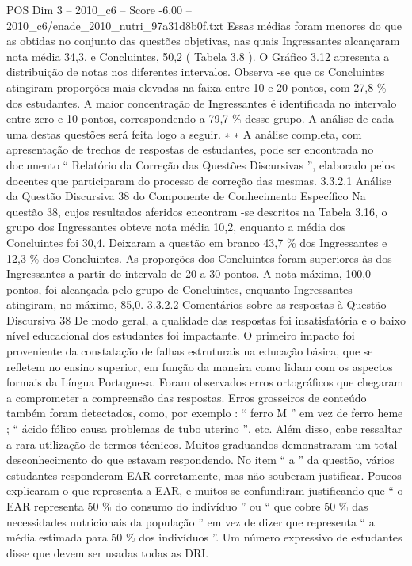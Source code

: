 \begin{textsample}{POS Dim 3 – 2010\_c6 – Score -6.00 – 2010\_c6/enade\_2010\_nutri\_97a31d8b0f.txt}
Essas médias foram menores do que as obtidas no conjunto das questões objetivas, nas quais Ingressantes alcançaram nota média 34,3, e Concluintes, 50,2 ( Tabela 3.8 ).
O Gráfico 3.12 apresenta a distribuição de notas nos diferentes intervalos.
Observa -se que os Concluintes atingiram proporções mais elevadas na faixa entre 10 e 20 pontos, com 27,8 \% dos estudantes.
A maior concentração de Ingressantes é identificada no intervalo entre zero e 10 pontos, correspondendo a 79,7 \% desse grupo.
A análise de cada uma destas questões será feita logo a seguir. ∗ ∗ A análise completa, com apresentação de trechos de respostas de estudantes, pode ser encontrada no documento “ Relatório da Correção das Questões Discursivas ”, elaborado pelos docentes que participaram do processo de correção das mesmas. 3.3.2.1 Análise da Questão Discursiva 38 do Componente de Conhecimento Específico Na questão 38, cujos resultados aferidos encontram -se descritos na Tabela 3.16, o grupo dos Ingressantes obteve nota média 10,2, enquanto a média dos Concluintes foi 30,4.
Deixaram a questão em branco 43,7 \% dos Ingressantes e 12,3 \% dos Concluintes.
As proporções dos Concluintes foram superiores às dos Ingressantes a partir do intervalo de 20 a 30 pontos.
A nota máxima, 100,0 pontos, foi alcançada pelo grupo de Concluintes, enquanto Ingressantes atingiram, no máximo, 85,0. 3.3.2.2 Comentários sobre as respostas à Questão Discursiva 38 De modo geral, a qualidade das respostas foi insatisfatória e o baixo nível educacional dos estudantes foi impactante.
O primeiro impacto foi proveniente da constatação de falhas estruturais na educação básica, que se refletem no ensino superior, em função da maneira como lidam com os aspectos formais da Língua Portuguesa.
Foram observados erros ortográficos que chegaram a comprometer a compreensão das respostas.
Erros grosseiros de conteúdo também foram detectados, como, por exemplo : “ ferro M ” em vez de ferro heme ; “ ácido fólico causa problemas de tubo uterino ”, etc.
Além disso, cabe ressaltar a rara utilização de termos técnicos.
Muitos graduandos demonstraram um total desconhecimento do que estavam respondendo.
No item “ a ” da questão, vários estudantes responderam EAR corretamente, mas não souberam justificar.
Poucos explicaram o que representa a EAR, e muitos se confundiram justificando que “ o EAR representa 50 \% do consumo do indivíduo ” ou “ que cobre 50 \% das necessidades nutricionais da população ” em vez de dizer que representa “ a média estimada para 50 \% dos indivíduos ”.
Um número expressivo de estudantes disse que devem ser usadas todas as DRI.

\end{textsample}

